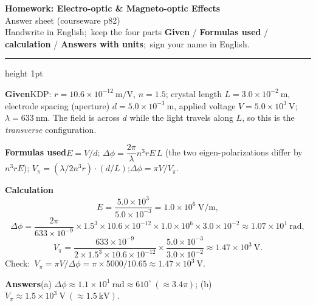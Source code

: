 \documentclass[10.5pt]{ctexart}
\begin{document}
\begin{center}
{\LARGE\bfseries\color{violetdeep} Homework: Electro-optic \& Magneto-optic Effects}\\[5pt]
{\color{petal}\small {}\enspace Answer sheet (courseware p82)\enspace {}}\\[4pt]
{\small\color{inkgray}Handwrite in English;\ keep the four parts \textbf{Given} / \textbf{Formulas used} /
\textbf{calculation} / \textbf{Answers with units};\ sign your name in English.}
\end{center}
\vspace{-2pt}
{\color{petal}\hrule height 1pt}


\textbf{Given}\quad KDP: $r=10.6\times10^{-12}\ \mathrm{m/V}$, $n=1.5$; crystal length
$L=3.0\times10^{-2}\ \mathrm{m}$, electrode spacing (aperture) $d=5.0\times10^{-3}\ \mathrm{m}$,
applied voltage $V=5.0\times10^{3}\ \mathrm{V}$; $\lambda=633\ \mathrm{nm}$. The field is across $d$ while the
light travels along $L$, so this is the \emph{transverse} configuration.

\textbf{Formulas used}\quad $E=V/d$;\quad
$\Delta\phi=\dfrac{2\pi}{\lambda}n^{3}rE\,L$ (the two eigen-polarizations differ by $n^3rE$);\quad
$V_\pi=(\lambda/2n^{3}r)\cdot(d/L)$;\quad $\Delta\phi=\pi V/V_\pi$.

\textbf{Calculation}\quad
\begin{equation*}
E=\frac{5.0\times10^{3}}{5.0\times10^{-3}}=1.0\times10^{6}\ \mathrm{V/m},
\end{equation*}
\begin{equation*}
\Delta\phi=\frac{2\pi}{633\times10^{-9}}\times1.5^{3}\times10.6\times10^{-12}\times1.0\times10^{6}\times3.0\times10^{-2}
\approx1.07\times10^{1}\ \mathrm{rad},
\end{equation*}
\begin{equation*}
V_\pi=\frac{633\times10^{-9}}{2\times1.5^{3}\times10.6\times10^{-12}}\times\frac{5.0\times10^{-3}}{3.0\times10^{-2}}
\approx1.47\times10^{3}\ \mathrm{V}.
\end{equation*}
Check:\ $V_\pi=\pi V/\Delta\phi=\pi\times5000/10.65\approx1.47\times10^{3}\ \mathrm{V}$.

\textbf{Answers}\quad (a) $\Delta\phi\approx1.1\times10^{1}\ \mathrm{rad}\approx610^{\circ}\ (\approx3.4\pi)$;\qquad
(b) $V_\pi\approx1.5\times10^{3}\ \mathrm{V}\ (\approx1.5\ \mathrm{kV})$.

\newpage
{}
\end{document}
